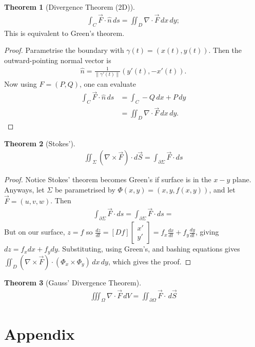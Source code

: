 \documentclass{article}
\theoremstyle{definition}
\newtheorem{thm}{Theorem}[subsubsection]
\begin{document}
\begin{thm}[Divergence Theorem (2D)]
	\begin{align*}
		\int_C\vec F\cdot\hat{n}\,ds=\iint_D\nabla\cdot\vec F\,dx\,dy;
	\end{align*}
	This is equivalent to Green's theorem.
\end{thm}
\begin{proof}
	Parametrise the boundary with $\gamma(t)=\left(x(t),y(t)\right)$. Then the outward-pointing normal vector is
	\begin{align*}
		\hat{n}=\frac{1}{\lVert\gamma'(t)\rVert}(y'(t),-x'(t)).
	\end{align*}
	Now using $F=(P,Q)$, one can evaluate
	\begin{align*}
		\int_C\vec F\cdot\hat{n}\,ds&=\int_C-Q\,dx+P\,dy\\
		&=\iint_D\nabla\cdot\vec F\,dx\,dy.
	\end{align*}
\end{proof}

\begin{thm}[Stokes']
	\begin{align*}
		\iint_\Sigma(\nabla\times\vec F)\cdot d\vec S=\int_{\partial\Sigma}\vec F\cdot ds
	\end{align*}
\end{thm}
\begin{proof}
	Notice Stokes' theorem becomes Green's if surface is in the $x-y$ plane. 
	Anyways, let $\Sigma$ be parametrised by $\Phi(x,y)=(x,y,f(x,y))$, and let $\vec F=(u,v,w)$.
	Then
	\begin{align*}
		\int_{\partial \Sigma}\vec F\cdot ds=\int_{\partial \Sigma}\vec F\cdot ds=
	\end{align*}
	But on our surface, $z=f$ so $\frac{dz}{dt}=[Df]\begin{bmatrix}x'\\y'\end{bmatrix}=f_x\frac{dx}{dt}+f_y\frac{dy}{dt}$, giving $dz=f_xdx+f_ydy$. Substituting, using Green's, and bashing equations gives $\iint_D(\nabla\times\vec F)\cdot(\Phi_x\times\Phi_y)\,dx\,dy$, which gives the proof.
\end{proof}

\begin{thm}[Gauss' Divergence Theorem]
	\begin{align*}
		\iiint_\Omega\nabla\cdot\vec F\,dV=\iint_{\partial\Omega}\vec F\cdot\,d\vec S
	\end{align*}
\end{thm}

\newpage
\appendix
\section{Appendix}
\end{document}
